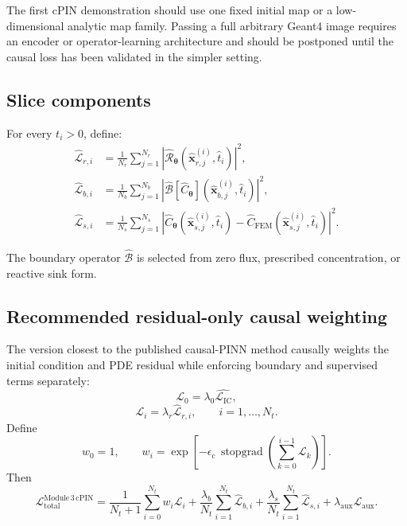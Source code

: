 \documentclass[11pt]{article}
\newcommand{\thetav}{\bm{\theta}}
\newcommand{\xv}{\bm{x}}
\newcommand{\Lic}{\mathcal{L}_{\mathrm{IC}}}
\newcommand{\Ltotal}{\mathcal{L}_{\mathrm{total}}}
\newcommand{\stgrad}{\operatorname{stopgrad}}
\newcommand{\epsc}{\epsilon_{\mathrm{c}}}
\begin{document}
The first cPIN demonstration should use one fixed initial map or a low-dimensional analytic map family. Passing a full arbitrary Geant4 image requires an encoder or operator-learning architecture and should be postponed until the causal loss has been validated in the simpler setting.

\subsection{Slice components}

For every $t_i>0$, define:
\begin{align}
\widehat{\mathcal{L}}_{r,i}
&=
\frac{1}{N_r}
\sum_{j=1}^{N_r}
\left|
\widehat{\mathcal{R}}_{\thetav}
(\hat{\xv}_{r,j}^{(i)},\hat{t}_i)
\right|^2,
\\
\widehat{\mathcal{L}}_{b,i}
&=
\frac{1}{N_b}
\sum_{j=1}^{N_b}
\left|
\widehat{\mathcal{B}}
\left[
\widehat{C}_{\thetav}
\right]
(\hat{\xv}_{b,j}^{(i)},\hat{t}_i)
\right|^2,
\\
\widehat{\mathcal{L}}_{s,i}
&=
\frac{1}{N_s}
\sum_{j=1}^{N_s}
\left|
\widehat{C}_{\thetav}
(\hat{\xv}_{s,j}^{(i)},\hat{t}_i)
-\widehat{C}_{\mathrm{FEM}}
(\hat{\xv}_{s,j}^{(i)},\hat{t}_i)
\right|^2.
\end{align}

The boundary operator $\widehat{\mathcal B}$ is selected from zero flux, prescribed concentration, or reactive sink form.

\subsection{Recommended residual-only causal weighting}

The version closest to the published causal-PINN method causally weights the initial condition and PDE residual while enforcing boundary and supervised terms separately:
\begin{equation}
\mathcal{L}_0=\lambda_0\widehat{\Lic},
\end{equation}
\begin{equation}
\mathcal{L}_i=\lambda_r\widehat{\mathcal{L}}_{r,i},
\qquad i=1,\ldots,N_t.
\end{equation}
Define
\begin{equation}
w_0=1,
\qquad
w_i
=
\exp\left[
-\epsc\,
\stgrad\left(
\sum_{k=0}^{i-1}\mathcal{L}_k
\right)
\right].
\label{eq:module3_weight}
\end{equation}
Then
\begin{equation}
\boxed{
\Ltotal^{\mathrm{Module\,3\,cPIN}}
=
\frac{1}{N_t+1}
\sum_{i=0}^{N_t}
w_i\mathcal{L}_i
+\frac{\lambda_b}{N_t}
\sum_{i=1}^{N_t}
\widehat{\mathcal{L}}_{b,i}
+\frac{\lambda_s}{N_t}
\sum_{i=1}^{N_t}
\widehat{\mathcal{L}}_{s,i}
+\lambda_{\mathrm{aux}}\mathcal{L}_{\mathrm{aux}}.
}
\label{eq:recommended_total}
\end{equation}
\end{document}
